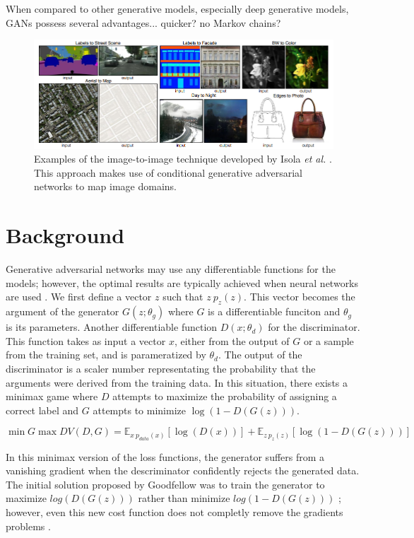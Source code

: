 \documentclass[11pt]{article}
\begin{document}
When compared to other generative models, especially deep generative models, GANs possess several advantages... quicker? no Markov chains?

\begin{figure}
\centering
\includegraphics[scale=0.65]{img2img}
\caption{Examples of the image-to-image technique developed by Isola \textit{et al.} \citep{2016arXiv161107004I}. This approach makes use of conditional generative adversarial networks to map image domains.}
\label{fig:Image to Image Examples}
\end{figure}

\section{Background}
Generative adversarial networks may use any differentiable functions for the models; however, the optimal results are typically achieved when neural networks are used \citep{2014arXiv1406.2661G}. We first define a vector $z$ such that $z~p_z(z)$. This vector becomes the argument of the generator $G(z;\theta_g)$ where $G$ is a differentiable funciton and $\theta_g$ is its parameters. Another differentiable function $D(x;\theta_d)$ for the discriminator. This function takes as input a vector $x$, either from the output of $G$ or a sample from the training set, and is parameratized by $\theta_d$. The output of the discriminator is a scaler number representating the probability that the arguments were derived from the training data. In this situation, there exists a minimax game where $D$ attempts to maximize the probability of assigning a correct label and $G$ attempts to minimize $\log(1-D(G(z)))$.

$$\min{G}\max{D}V(D, G) = \mathbb{E}_{x~p_{data}(x)}[\log(D(x))] + \mathbb{E}_{z~p_z(z)}[\log(1-D(G(z)))]$$

In this minimax version of the loss functions, the generator suffers from a vanishing gradient when the descriminator confidently rejects the generated data. The initial solution proposed by Goodfellow was to train the generator to maximize $log(D(G(z)))$ rather than minimize $log(1-D(G(z)))$ \citep{2014arXiv1406.2661G}; however, even this new cost function does not completly remove the gradients problems \citep{2017arXiv170104862A}.
\end{document}
